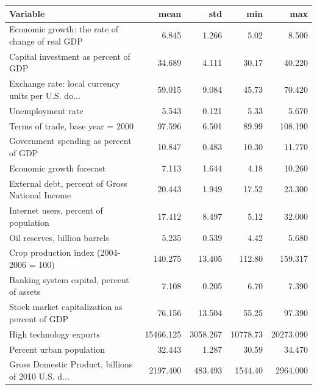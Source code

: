 \documentclass[11pt]{article}
\begin{document}
\begin{table}[H]
\begin{tabular}{lrrrr}
\toprule
{} Variable&        mean &         std &        min &          max \\
\midrule
Economic growth: the rate of change of real GDP    &       6.845 &       1.266 &       5.02 &        8.500 \\
Capital investment as percent of GDP               &      34.689 &       4.111 &      30.17 &       40.220 \\
Exchange rate: local currency units per U.S. do... &      59.015 &       9.084 &      45.73 &       70.420 \\
Unemployment rate                                  &       5.543 &       0.121 &       5.33 &        5.670 \\
Terms of trade, base year = 2000                   &      97.596 &       6.501 &      89.99 &      108.190 \\
Government spending as percent of GDP              &      10.847 &       0.483 &      10.30 &       11.770 \\
Economic growth forecast                           &       7.113 &       1.644 &       4.18 &       10.260 \\
External debt, percent of Gross National Income    &      20.443 &       1.949 &      17.52 &       23.300 \\
Internet users, percent of population              &      17.412 &       8.497 &       5.12 &       32.000 \\
Oil reserves, billion barrels                      &       5.235 &       0.539 &       4.42 &        5.680 \\
Crop production index (2004-2006 = 100)            &     140.275 &      13.405 &     112.80 &      159.317 \\
Banking system capital, percent of assets          &       7.108 &       0.205 &       6.70 &        7.390 \\
Stock market capitalization as percent of GDP      &      76.156 &      13.504 &      55.25 &       97.390 \\
High technology exports                            &   15466.125 &    3058.267 &   10778.73 &    20273.090 \\
Percent urban population                           &      32.443 &       1.287 &      30.59 &       34.470 \\
Gross Domestic Product, billions of 2010 U.S. d... &    2197.400 &     483.493 &    1544.40 &     2964.000 \\

\end{tabular}
\end{table}
\end{document}
